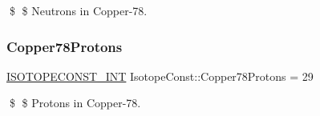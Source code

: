 \$ \$ Neutrons in Copper-\/78. \mbox{\label{group___isotope_const-_copper-_cu78_gaf2fb7b9034310007509243d9cdd76b8e}} 
\subsubsection{\texorpdfstring{Copper78\+Protons}{Copper78Protons}}
{\footnotesize\ttfamily \mbox{\hyperlink{group___isotope_const-_macros_ga5f18360b3e99483a35c32d789e62621c}{I\+S\+O\+T\+O\+P\+E\+C\+O\+N\+S\+T\+\_\+\+I\+NT}} Isotope\+Const\+::\+Copper78\+Protons = 29}

\$ \$ Protons in Copper-\/78. 
